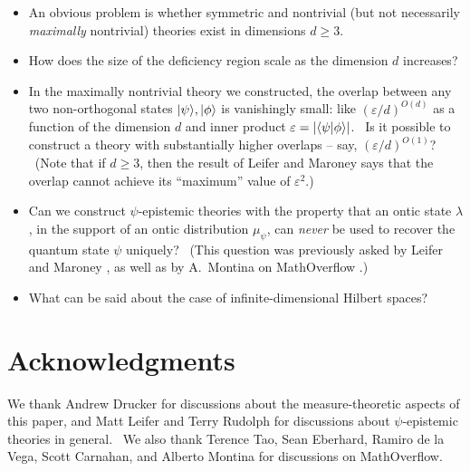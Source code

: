 \documentclass[letterpaper,12pt]{article}
\newcommand{\braket}[2]{\mbox{$ \langle #1 | #2 \rangle $}}
\newcommand{\ket}[1]{\mbox{$ | #1 \rangle $}}
\begin{document}
\begin{itemize}
\item An obvious problem is
whether symmetric and nontrivial (but not necessarily \emph{maximally} nontrivial) theories exist in dimensions $d\geq 3$.

\item How does the size of the deficiency region scale as the dimension $d$ increases?

\item In the maximally nontrivial theory we constructed, the overlap between any two non-orthogonal
states $\ket{\psi},\ket{\phi}$ is vanishingly small: like $(\varepsilon / d)^{O(d)}$ as a function of the dimension $d$ and inner product $\varepsilon = \left| \braket{\psi}{\phi} \right|$. \ Is it possible to construct a theory with substantially higher overlaps -- say, $(\varepsilon / d)^{O(1)}$? \ (Note that if $d\geq 3$, then the result of Leifer and Maroney \cite{marleif} says that the overlap cannot achieve its ``maximum'' value of $\varepsilon^2$.)

\item Can we construct $\psi$-epistemic theories with the property that an ontic state $\lambda$, in the support of an ontic distribution $\mu_{\psi}$, can \emph{never} be used to recover the quantum state $\psi$ uniquely? \ (This question was previously asked by Leifer and Maroney \cite{marleif}, as well as by A.\ Montina on MathOverflow \cite{mathoverflow}.)

\item What can be said about the case of infinite-dimensional Hilbert spaces?

\end{itemize}

\section{Acknowledgments}

We thank Andrew Drucker for discussions about the measure-theoretic aspects of this paper, and Matt Leifer and Terry Rudolph for discussions about $\psi$-epistemic theories in general. \ We also thank Terence Tao, Sean Eberhard, Ramiro de la Vega, Scott Carnahan, and Alberto Montina for discussions on MathOverflow.
\end{document}
